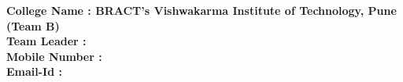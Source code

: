 \documentclass[10pt, a4paper, oneside]{article}					%
\begin{document}
\begin{flushleft}
    \textbf{College Name	: BRACT’s Vishwakarma Institute of Technology, Pune (Team B)}\\
    \textbf{Team Leader		:                                                           }\\
    \textbf{Mobile Number	:                                                           }\\
    \textbf{Email-Id		:                                                           }\\
\end{flushleft}





\end{document}
